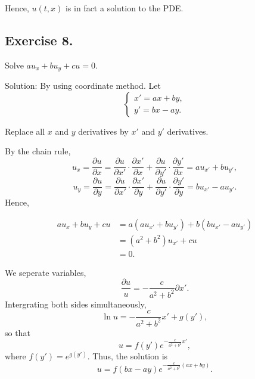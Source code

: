 \documentclass{article}
\begin{document}
			Hence, $u(t,x)$ is in fact a solution to the PDE.


		\subsection{Exercise 8.}
		Solve $au_x+bu_y+cu=0.$
		
		Solution:
		By using coordinate method. Let 
		\begin{equation*}
			\begin{cases}
				x'=ax+by,
				\\
				y'=bx-ay.
			\end{cases}
		\end{equation*}

		Replace all $x$ and $y$ derivatives by $x'$ and $y'$ derivatives.

		By the chain rule, \[u_x=\frac{\partial u}{\partial x}=\frac{\partial u}{\partial x'}\cdot\frac{\partial x'}{\partial x}+\frac{\partial u}{\partial y'}\cdot\frac{\partial y'}{\partial x}=au_{x'}+bu_{y'},\]
		\[u_y=\frac{\partial u}{\partial y}=\frac{\partial u}{\partial x'}\cdot\frac{\partial x'}{\partial y}+\frac{\partial u}{\partial y'}\cdot\frac{\partial y'}{\partial y}=bu_{x'}-au_{y'}.\]
		Hence,

		\begin{equation*}
			\begin{aligned}
			au_x+bu_y+cu&=
			a\left(au_{x'}+bu_{y'} \right)+b\left(bu_{x'}-au_{y'}\right)\\
			&=\left(a^2+b^2\right)u_{x'}+cu\\
			&=0.
			\end{aligned}
		\end{equation*}

		We seperate variables, \[\frac{\partial u}{u}=-\frac{c}{a^2+b^2}\partial x'.\]
		Intergrating both sides simultaneously, \[\ln u = -\frac{c}{a^2+b^2}x' +g(y'),\] so that \[ u = f(y')e^{-\frac{c}{a^2+b^2}x'}, \]
		where $f(y')=e^{g(y')}$.
		Thus, the solution is  \[ u = f(bx-ay)e^{-\frac{c}{a^2+b^2}(ax+by)}.\]
\end{document}
